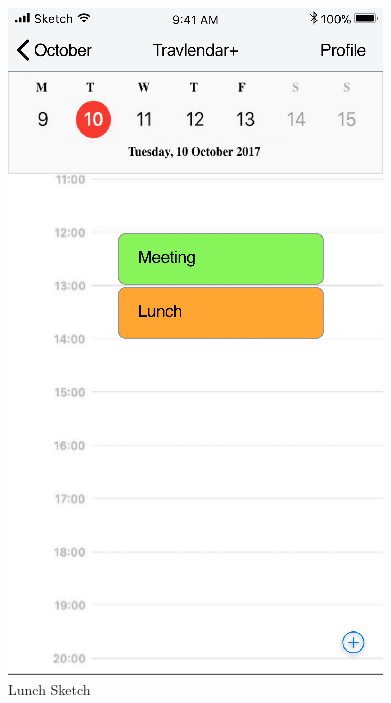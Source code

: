 \begin{figure}[H]
	\hspace{0.5cm}
	\includegraphics[scale=0.23]{Images/Interface/Lunch/4_calendar+meeting+lunch}
	\caption{Lunch Sketch}
\end{figure}

